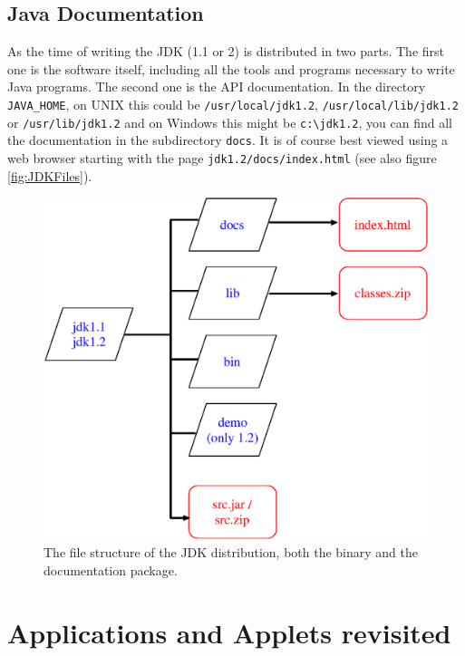\subsection{Java Documentation}
As the time of writing the JDK (1.1 or 2) is distributed in
two parts. The first one is the software itself, including all
the tools and programs necessary to write Java programs. 
The second one is the API documentation. 
In the directory \verb|JAVA_HOME|, on UNIX this could be 
\verb|/usr/local/jdk1.2|, \verb|/usr/local/lib/jdk1.2| or 
\verb|/usr/lib/jdk1.2| and on Windows this might be \verb|c:\jdk1.2|, 
you can find all the documentation in the subdirectory
\verb|docs|. It is of course best viewed using a web browser
starting with the page \verb|jdk1.2/docs/index.html| 
(see also figure \ref{fig:JDKFiles}).
\begin{figure}[htbp]
  \begin{center}
    \includegraphics[width=\textwidth]{Figures/JDKDocumentation.eps}
    \caption{The file structure of the JDK distribution, both the binary and the documentation package.}
    \label{fig:JDKDocumentation}
  \end{center}
\end{figure}


\section{Applications and Applets revisited}

